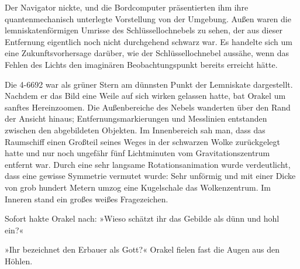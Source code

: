 
Der Navigator nickte, und die Bordcomputer präsentierten ihm ihre quantenmechanisch unterlegte Vorstellung von der Umgebung. Außen waren die lemniskatenförmigen Umrisse des Schlüssellochnebels zu sehen, der aus dieser Entfernung eigentlich noch nicht durchgehend schwarz war. Es handelte sich um eine Zukunftsvorhersage darüber, wie der Schlüssellochnebel aussähe, wenn das Fehlen des Lichts den imaginären Beobachtungspunkt bereits erreicht hätte.

Die 4-6692 war als grüner Stern am dünnsten Punkt der Lemniskate dargestellt. Nachdem er das Bild eine Weile auf sich wirken gelassen hatte, bat Orakel um sanftes Hereinzoomen. Die Außenbereiche des Nebels wanderten über den Rand der Ansicht hinaus; Entfernungsmarkierungen und Messlinien entstanden zwischen den abgebildeten Objekten. Im Innenbereich sah man, dass das Raumschiff einen Großteil seines Weges in der schwarzen Wolke zurückgelegt hatte und nur noch ungefähr fünf Lichtminuten vom Gravitationszentrum entfernt war. Durch eine sehr langsame Rotationsanimation wurde verdeutlicht, dass eine gewisse Symmetrie vermutet wurde: Sehr unförmig und mit einer Dicke von grob hundert Metern umzog eine Kugelschale das Wolkenzentrum. Im Inneren stand ein großes weißes Fragezeichen.

Sofort hakte Orakel nach: »Wieso schätzt ihr das Gebilde als dünn und hohl ein?«


»Ihr bezeichnet den Erbauer als Gott?« Orakel fielen fast die Augen aus den Höhlen.


